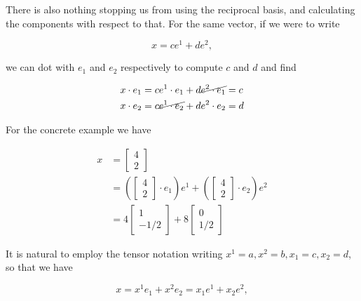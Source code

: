 \documentclass[iop,tighten]{emulateapj}
\begin{document}
There is also nothing stopping us from using the reciprocal basis, and calculating the components with respect to that.  For the same vector, if we were to write

\begin{equation}\label{eqn:grahamSchmidtLorentz:250}
x = c e^1 + d e^2,
\end{equation}

we can dot with $e_1$ and $e_2$ respectively to compute $c$ and $d$ and find

\begin{equation}\label{eqn:grahamSchmidtLorentz:360}
\begin{aligned}
x \cdot e_1 &= c e^1 \cdot e_1 + d \cancel{e^2 \cdot e_1} = c \\
x \cdot e_2 &= c \cancel{e^1 \cdot e_2} + d e^2 \cdot e_2 = d
\end{aligned}
\end{equation}

For the concrete example we have

\begin{equation}\label{eqn:grahamSchmidtLorentz:290}
\begin{aligned}
x 
&= 
\begin{bmatrix}
4 \\
2
\end{bmatrix} \\
&=
\left(
\begin{bmatrix}
4 \\
2
\end{bmatrix} 
\cdot e_1
\right)
e^1
+
\left(
\begin{bmatrix}
4 \\
2
\end{bmatrix} 
\cdot e_2
\right)
e^2 \\
&= 4 
\begin{bmatrix}
1 \\
-1/2
\end{bmatrix} 
+ 
8
\begin{bmatrix}
0 \\
1/2
\end{bmatrix}
\end{aligned}
\end{equation}

It is natural to employ the tensor notation writing $x^1 = a, x^2 = b, x_1 = c, x_2 = d$, so that we have

\begin{equation}\label{eqn:grahamSchmidtLorentz:310}
x = x^1 e_1 + x^2 e_2 = x_1 e^1 + x_2 e^2,
\end{equation}
\end{document}
